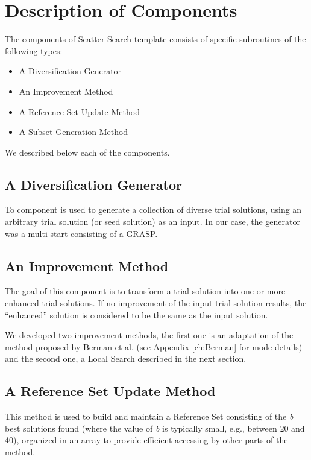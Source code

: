 \section{Description of Components}
The components of Scatter Search template \cite{glover1998template}
consists of
specific subroutines of the following types:
\begin{itemize}
\item A Diversification Generator
\item An Improvement Method
\item A Reference Set Update Method
\item A Subset Generation Method
\end{itemize}
We described below
each of the components.

\subsection{A Diversification Generator}
To component is used to generate
a collection of diverse trial solutions,
using an arbitrary trial solution
(or seed solution) as an input.
%
In our case,
the generator was a multi-start
consisting of a GRASP.


\subsection{An Improvement Method}
The goal of this component
is to transform a trial solution
into one or more enhanced trial solutions. 
If no improvement
of the input trial solution results, 
the ``enhanced'' solution
is considered to be
the same as the input solution.

We developed two improvement methods,
the first one is an adaptation
of the method proposed by Berman et al. \cite{berman1987stochastic}
(see Appendix \ref{ch:Berman} for mode details)
and the second one,
a Local Search
described in the next section.


\subsection{A Reference Set Update Method}
This method is used
to build and maintain a Reference Set
consisting of the \textit{b} best solutions found
(where the value of \textit{b}
is typically small,
e.g., between 20 and 40),
organized in an array
to provide efficient accessing
by other parts of the method.

